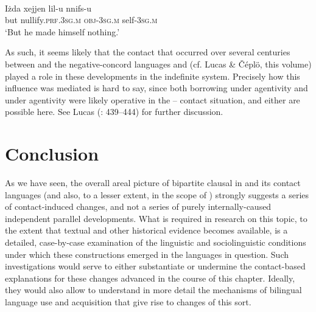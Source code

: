\documentclass[output=paper]{langsci/langscibook}
\begin{document}
\ea\label{ex:mlt1}
{        \citep[441]{Lucas2013}}\\
\gll Iżda xejjen lil-u nnifs-u\\
     but nullify.\textsc{prf.3sg.m} \textsc{obj-3sg.m} self-\textsc{3sg.m}\\
\glt ‘But he made himself nothing.’
\z

As such, it seems likely that the  contact that occurred over several centuries between  and the negative-concord languages  and  (cf. Lucas \& Čéplö, this volume) played a role in these developments in the  indefinite system. Precisely how this influence was mediated is hard to say, since both borrowing under  agentivity and  under  agentivity were likely operative in the – contact situation, and either are possible here. See Lucas (\citeyear{Lucas2013}: 439–444) for further discussion.

\section{Conclusion}

As we have seen, the overall areal picture of bipartite clausal  in  and its contact languages (and also, to a lesser extent,  in the scope of ) strongly suggests a series of contact-induced changes, and not a series of purely internally-caused independent parallel developments. What is required in  research on this topic, to the extent that textual and other historical evidence becomes available, is a detailed, case-by-case examination of the linguistic and sociolinguistic conditions under which these constructions emerged in the languages in question. Such investigations would serve to either substantiate or undermine the contact-based explanations for these changes advanced in the course of this chapter. Ideally, they would also allow to understand in more detail the mechanisms of bilingual language use and acquisition that give rise to changes of this sort.
\end{document}
